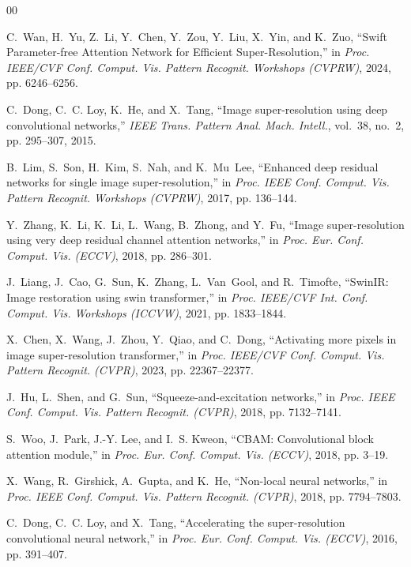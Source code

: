 \documentclass[conference]{IEEEtran}
\begin{document}
\begin{thebibliography}{00}
\footnotesize
\linespread{0.94}\selectfont
\setlength{\itemsep}{0pt}
\setlength{\parskip}{0pt}

C.~Wan, H.~Yu, Z.~Li, Y.~Chen, Y.~Zou, Y.~Liu, X.~Yin, and K.~Zuo,
``Swift Parameter-free Attention Network for Efficient Super-Resolution,''
in \emph{Proc. IEEE/CVF Conf. Comput. Vis. Pattern Recognit. Workshops (CVPRW)}, 2024, pp. 6246--6256.

C.~Dong, C.~C. Loy, K.~He, and X.~Tang,
``Image super-resolution using deep convolutional networks,''
\emph{IEEE Trans. Pattern Anal. Mach. Intell.}, vol.~38, no.~2, pp. 295--307, 2015.

B.~Lim, S.~Son, H.~Kim, S.~Nah, and K.~Mu~Lee,
``Enhanced deep residual networks for single image super-resolution,''
in \emph{Proc. IEEE Conf. Comput. Vis. Pattern Recognit. Workshops (CVPRW)}, 2017, pp. 136--144.

Y.~Zhang, K.~Li, K.~Li, L.~Wang, B.~Zhong, and Y.~Fu,
``Image super-resolution using very deep residual channel attention networks,''
in \emph{Proc. Eur. Conf. Comput. Vis. (ECCV)}, 2018, pp. 286--301.

J.~Liang, J.~Cao, G.~Sun, K.~Zhang, L.~Van~Gool, and R.~Timofte,
``SwinIR: Image restoration using swin transformer,''
in \emph{Proc. IEEE/CVF Int. Conf. Comput. Vis. Workshops (ICCVW)}, 2021, pp. 1833--1844.

X.~Chen, X.~Wang, J.~Zhou, Y.~Qiao, and C.~Dong,
``Activating more pixels in image super-resolution transformer,''
in \emph{Proc. IEEE/CVF Conf. Comput. Vis. Pattern Recognit. (CVPR)}, 2023, pp. 22367--22377.

J.~Hu, L.~Shen, and G.~Sun,
``Squeeze-and-excitation networks,''
in \emph{Proc. IEEE Conf. Comput. Vis. Pattern Recognit. (CVPR)}, 2018, pp. 7132--7141.

S.~Woo, J.~Park, J.-Y. Lee, and I.~S. Kweon,
``CBAM: Convolutional block attention module,''
in \emph{Proc. Eur. Conf. Comput. Vis. (ECCV)}, 2018, pp. 3--19.

X.~Wang, R.~Girshick, A.~Gupta, and K.~He,
``Non-local neural networks,''
in \emph{Proc. IEEE Conf. Comput. Vis. Pattern Recognit. (CVPR)}, 2018, pp. 7794--7803.

C.~Dong, C.~C. Loy, and X.~Tang,
``Accelerating the super-resolution convolutional neural network,''
in \emph{Proc. Eur. Conf. Comput. Vis. (ECCV)}, 2016, pp. 391--407.


\end{thebibliography}
\end{document}
